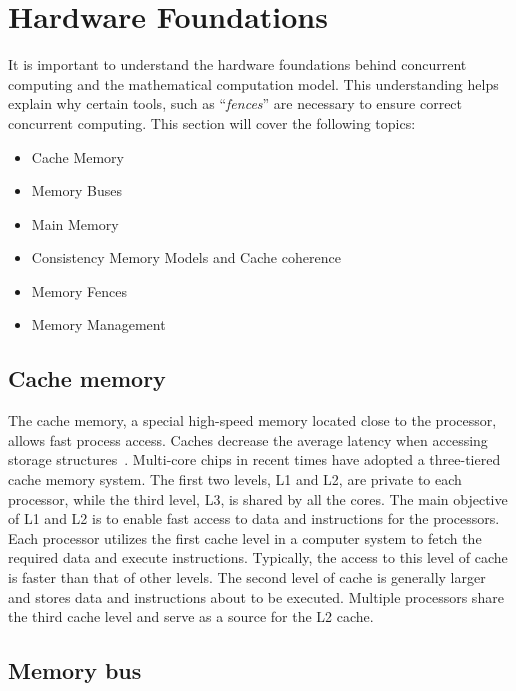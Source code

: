 \section{\label{sec:hardware-foundations}Hardware Foundations}

It is important to understand the hardware foundations behind concurrent computing and the mathematical computation model. This understanding helps explain why certain tools, such as ``\emph{fences}'' are necessary to ensure correct concurrent computing. This section will cover the following topics:

\begin{itemize}
\item Cache Memory
\item Memory Buses
\item Main Memory
\item Consistency Memory Models and Cache coherence
\item Memory Fences
\item Memory Management
\end{itemize}

\subsection{Cache memory}
\label{sec:org49cf4b1}

The cache memory, a special high-speed memory located close to the processor, allows fast process access. Caches decrease the average latency when accessing storage structures~\cite{DBLP_series_synthesis_2020Nagarajan}. Multi-core chips in recent times have adopted a three-tiered cache memory system. The first two levels, L1 and L2, are private to each processor, while the third level, L3, is shared by all the cores. The main objective of L1 and L2 is to enable fast access to data and instructions for the processors.
Each processor utilizes the first cache level in a computer system to fetch the required data and execute instructions. Typically, the access to this level of cache is faster than that of other levels. The second level of cache is generally larger and stores data and instructions about to be executed. Multiple processors share the third cache level and serve as a source for the L2 cache.

\subsection{Memory bus}
\label{sec:orgda21942}

